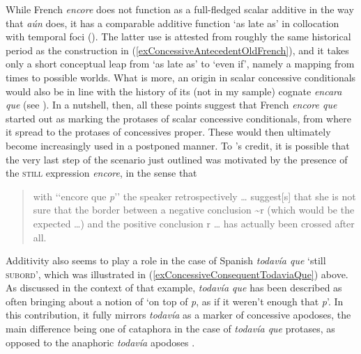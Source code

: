 While French \textit{encore} does not function as a full-fledged scalar additive in the way that  \textit{aún} does, it has a comparable additive function \lq as late as\rq{ }in collocation with temporal foci (). The latter use is attested from roughly the same historical period as the construction in (\ref{exConcessiveAntecedentOldFrench}), and it takes only a short conceptual leap from \lq as late as\rq{ }to \lq even if\rq{}, namely a mapping from times to possible worlds. What is more, an origin in scalar concessive conditionals would also be in line with the history of its  (not in my sample) cognate \textit{encara} \textit{que} (see \cite{PerezSaldanyaSalvador1995}). In a nutshell, then, all these points suggest that French \textit{encore que} started out as marking the protases of scalar concessive conditionals, from where it spread to the protases of concessives proper. These would then ultimately become increasingly used in a postponed manner. To \citeauthor{MosegaardHansen2008}'s credit, it is possible that the very last step of the scenario just outlined was motivated by the presence of the \textsc{still} expression \textit{encore}, in the sense that

\begin{quote}
with \lq\lq encore que \textit{p}\rq\rq{} the speaker retrospectively … suggest[s] that she is not sure that the border between a negative conclusion \sim{}r (which would be the expected …) and the positive conclusion r … has actually been crossed after all. \parencite[212]{MosegaardHansen2008}
\end{quote}
 

Additivity also seems to play a role in the case of Spanish \textit{todavía que} \lq still \textsc{subord}\rq{}, which was illustrated in (\ref{exConcessiveConsequentTodaviaQue}) above. As discussed in the context of that example, \textit{todavía que} has been described as often bringing about a notion of \lq on top of \textit{p}, as if it weren't enough that \textit{p}\rq{}. In this contribution, it fully mirrors \textit{todavía} as a marker of concessive apodoses, the main difference being one of cataphora in the case of \textit{todavía que} protases, as opposed to the anaphoric \textit{todavía} apodoses \parencite{Bosque2016}.


